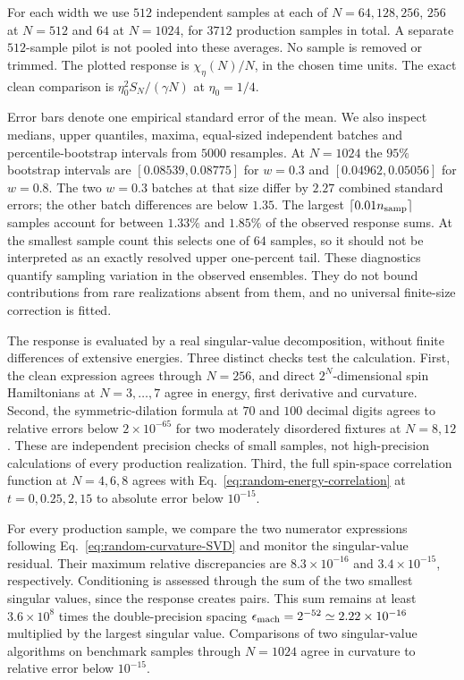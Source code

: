 \documentclass[aps,pre,reprint,amsmath,amssymb,longbibliography,floatfix]{revtex4-2}
\begin{document}
For each width we use $512$ independent samples at each of
$N=64,128,256$, $256$ at $N=512$ and $64$ at $N=1024$, for $3712$
production samples in total. A separate $512$-sample pilot is not
pooled into these averages. No sample is removed or trimmed.
The plotted response is $\chi_\eta(N)/N$, in the chosen time units.
The exact clean comparison is
$\eta_0^2 S_N/(\gamma N)$ at $\eta_0=1/4$.

Error bars denote one empirical standard error of the mean. We also
inspect medians, upper quantiles, maxima, equal-sized independent
batches and percentile-bootstrap intervals from $5000$ resamples.
At $N=1024$ the $95\%$ bootstrap intervals are
$\left[0.08539,0.08775\right]$ for $w=0.3$ and $\left[0.04962,0.05056\right]$ for $w=0.8$.
The two $w=0.3$ batches at that size differ by $2.27$ combined standard
errors; the other batch differences are below $1.35$.
The largest $\lceil0.01n_{\rm samp}\rceil$ samples account for
between $1.33\%$ and $1.85\%$ of the observed response sums. At the
smallest sample count this selects one of $64$ samples, so it should
not be interpreted as an exactly resolved upper one-percent tail.
These diagnostics quantify sampling variation in the observed
ensembles. They do not bound contributions from rare realizations
absent from them, and no universal finite-size correction is fitted.

The response is evaluated by a real singular-value decomposition,
without finite differences of extensive energies. Three distinct
checks test the calculation. First, the clean expression agrees
through $N=256$, and direct $2^N$-dimensional spin Hamiltonians at
$N=3,\ldots,7$ agree in energy, first derivative and curvature.
Second, the symmetric-dilation formula at $70$ and $100$ decimal
digits agrees to relative errors below $2\times10^{-65}$ for two
moderately disordered fixtures at $N=8,12$. These are independent
precision checks of small samples, not high-precision calculations
of every production realization. Third, the full spin-space
correlation function at $N=4,6,8$ agrees with
Eq.~\eqref{eq:random-energy-correlation} at
$t=0,0.25,2,15$ to absolute error below $10^{-15}$.

For every production sample, we compare the two numerator expressions
following Eq.~\eqref{eq:random-curvature-SVD} and monitor the
singular-value residual. Their maximum relative discrepancies are
$8.3\times10^{-16}$ and $3.4\times10^{-15}$, respectively.
Conditioning is assessed through the sum of the two smallest singular
values, since the response creates pairs. This sum remains at least
$3.6\times10^8$ times the double-precision spacing $\epsilon_{\rm mach}=2^{-52}\simeq2.22\times10^{-16}$  multiplied by the largest
singular value. Comparisons of two singular-value algorithms on
benchmark samples through $N=1024$ agree in curvature to relative error
below $10^{-15}$.
\end{document}
